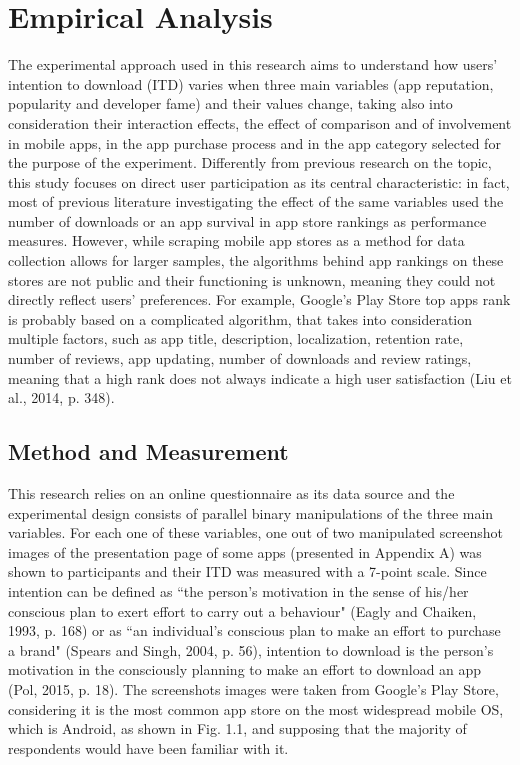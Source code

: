 

\chapter{Empirical Analysis}
\label{chapter3}
\thispagestyle{empty}

The experimental approach used in this research aims to understand how users' intention to download (ITD) varies when three main variables (app reputation, popularity and developer fame) and their values change, taking also into consideration their interaction effects, the effect of comparison and of involvement in mobile apps, in the app purchase process and in the app category selected for the purpose of the experiment. Differently from previous research on the topic, this study focuses on direct user participation as its central characteristic: in fact, most of previous literature investigating the effect of the same variables used the number of downloads or an app survival in app store rankings as performance measures. However, while scraping mobile app stores as a method for data collection allows for larger samples, the algorithms behind app rankings on these stores are not public and their functioning is unknown, meaning they could not directly reflect users' preferences. For example, Google's Play Store top apps rank is probably based on a complicated algorithm, that takes into consideration multiple factors, such as app title, description, localization, retention rate, number of reviews, app updating, number of downloads and review ratings, meaning that a high rank does not always indicate a high user satisfaction (Liu et al., 2014, p. 348). 

\section{Method and Measurement}

This research relies on an online questionnaire as its data source and the experimental design consists of parallel binary manipulations of the three main variables. For each one of these variables, one out of two manipulated screenshot images of the presentation page of some apps (presented in Appendix A) was shown to participants and their ITD was measured with a 7-point scale. Since intention can be defined as ``the person’s motivation in the sense of his/her conscious plan to exert effort to carry out a behaviour" (Eagly and Chaiken, 1993, p. 168) or as ``an individual’s conscious plan to make an effort to purchase a brand" (Spears and Singh, 2004, p. 56), intention to download is the person’s motivation in the consciously planning to make an effort to download an app (Pol, 2015, p. 18). The screenshots images were taken from Google's Play Store, considering it is the most common app store on the most widespread mobile OS, which is Android, as shown in Fig. 1.1, and supposing that the majority of respondents would have been familiar with it.

